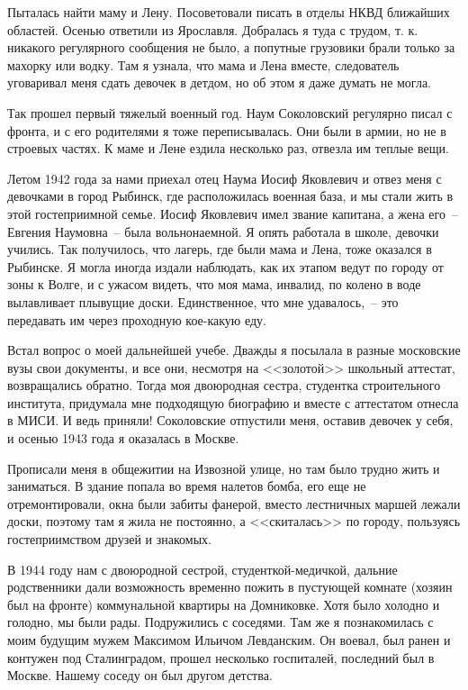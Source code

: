 Пыталась найти  маму и Лену. Посоветовали писать в отделы НКВД ближайших 
областей. Осенью ответили из Ярославля. Добралась я туда  с трудом, т. к.  никакого 
регулярного  сообщения  не было,  а попутные грузовики  брали  только  за  махорку 
или водку. Там  я узнала,  что  мама  и  Лена  вместе, следователь  уговаривал  меня 
сдать девочек в детдом, но об этом я даже думать не могла.

Так прошел первый тяжелый военный год.  Наум Соколовский  регулярно  писал 
с фронта,  и  с его родителями я тоже переписывалась.  Они были  в  армии, но  не  в 
строевых частях. К маме и Лене ездила несколько раз, отвезла им теплые вещи.

Летом  1942 года за нами приехал отец Наума Иосиф Яковлевич и отвез меня  с 
девочками в город  Рыбинск, где  расположилась  военная база, и мы стали  жить в 
этой  гостеприимной  семье.  Иосиф  Яковлевич имел звание капитана, а  жена его~-- 
Евгения Наумовна~-- была  вольнонаемной.  Я  опять  работала  в  школе, девочки 
учились.  Так  получилось,  что  лагерь, где  были  мама и Лена,  тоже оказался  в 
Рыбинске.  Я  могла  иногда издали  наблюдать, как  их этапом  ведут  по городу от 
зоны  к  Волге,  и  с  ужасом  видеть, что  моя  мама, инвалид,  по  колено  в  воде 
вылавливает  плывущие доски. Единственное, что  мне  удавалось,~-- это  передавать 
им через проходную  кое-какую еду.

Встал  вопрос  о моей  дальнейшей  учебе.  Дважды  я  посылала  в  разные 
московские вузы свои документы, и  все они, несмотря  на <<золотой>>  школьный 
аттестат,  возвращались  обратно.  Тогда  моя  двоюродная  сестра,  студентка 
строительного  института,  придумала  мне  подходящую  биографию  и  вместе с 
аттестатом  отнесла  в  МИСИ.  И  ведь  приняли!  Соколовские  отпустили  меня, 
оставив  девочек  у себя,  и осенью  1943 года я оказалась в Москве.

Прописали меня в общежитии на Извозной улице, но там  было  трудно жить  и 
заниматься. В здание попала во время налетов бомба, его еще  не отремонтировали, 
окна были забиты  фанерой, вместо лестничных маршей лежали доски, поэтому там 
я  жила не постоянно, а <<скиталась>>  по городу, пользуясь гостеприимством  друзей 
и  знакомых.

В  1944 году  нам  с  двоюродной  сестрой,  студенткой-медичкой,  дальние 
родственники дали  возможность временно  пожить  в пустующей  комнате (хозяин 
был на фронте) коммунальной  квартиры  на  Домниковке.  Хотя  было холодно  и 
голодно, мы были  рады. Подружились  с  соседями.  Там же  я  познакомилась  с 
моим  будущим мужем  Максимом  Ильичом  Левданским.  Он  воевал,  был  ранен 
и  контужен  под Сталинградом,  прошел  несколько госпиталей,  последний  был 
в  Москве.  Нашему  соседу он был другом детства.


